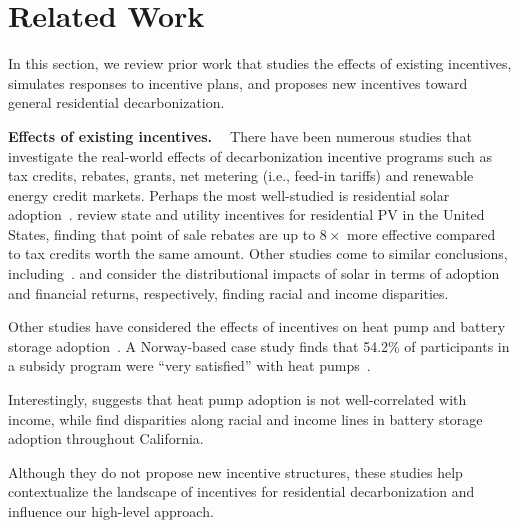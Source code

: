 \section{Related Work}
\label{sec:relwork}
In this section, we review prior work that studies the effects of existing incentives, simulates responses to incentive plans, and proposes new incentives toward general residential decarbonization. 

\noindent\textbf{Effects of existing incentives. \ }
There have been numerous studies that investigate the real-world effects of decarbonization incentive programs such as tax credits, rebates, grants, net metering (i.e., feed-in tariffs) and renewable energy credit markets. Perhaps the most well-studied is residential solar adoption~\cite{Sarzynski2012, Bauner2015, Hagerman2016, Crago2017, Matisoff2017, Sunter:19, Boccard2021, Peasco2021, Kearns2022, Crago:23}.  \citet{Matisoff2017} review state and utility incentives for residential PV in the United States, finding that point of sale rebates are up to $8\times$ more effective compared to tax credits worth the same amount.  Other studies come to similar conclusions, including~\cite{Crago2017, Kearns2022}.  \citet{Sunter:19} and \citet{Crago:23} consider the distributional impacts of solar in terms of adoption and financial returns, respectively, finding racial and income disparities.

Other studies have considered the effects of incentives on heat pump and battery storage adoption~\cite{Bjrnstad2012, Snape2015, Alberini2015, Alberini2016, Lill2019, Carroll2020, Brown2022, Shen2022, Davis2023}. A Norway-based case study finds that 54.2\% of participants in a subsidy program were ``very satisfied'' with heat pumps~\cite{Bjrnstad2012}. 

Interestingly, \citet{Davis2023} suggests that heat pump adoption is not well-correlated with income, while \citet{Brown2022} find disparities along racial and income lines in battery storage adoption throughout California. 

Although they do not propose new incentive structures, these studies help contextualize the landscape of incentives for residential decarbonization  and influence our high-level approach.



